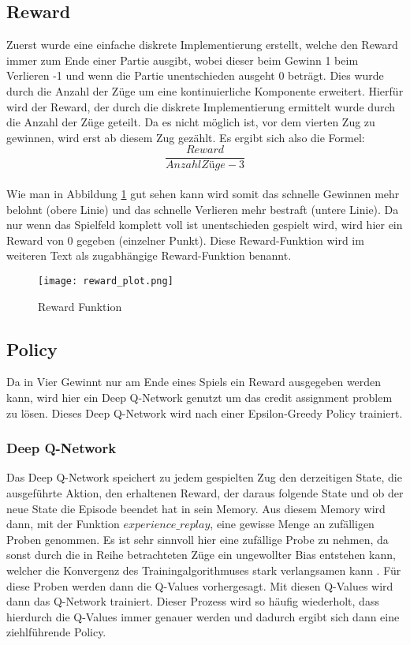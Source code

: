 \subsection{Reward}
 Zuerst wurde eine einfache diskrete Implementierung erstellt, welche den Reward immer zum Ende einer Partie ausgibt, wobei dieser beim Gewinn 1 beim Verlieren -1 und wenn die Partie unentschieden ausgeht 0 beträgt.
Dies wurde durch die Anzahl der Züge um eine kontinuierliche Komponente erweitert. Hierfür wird der Reward, der durch die diskrete Implementierung ermittelt wurde durch die Anzahl der Züge geteilt. Da es nicht möglich ist, vor dem vierten Zug zu gewinnen, wird erst ab diesem Zug gezählt. Es ergibt sich also die Formel: \\$$\frac{Reward}{Anzahl Züge-3}$$\\
Wie man in Abbildung \ref{fig:reward_function} gut sehen kann wird somit das schnelle Gewinnen mehr belohnt (obere Linie) und das schnelle Verlieren mehr bestraft (untere Linie). Da nur wenn das Spielfeld komplett voll ist unentschieden gespielt wird, wird hier ein Reward von 0 gegeben (einzelner Punkt). Diese Reward-Funktion wird im weiteren Text als zugabhängige Reward-Funktion benannt. \\

\begin{figure}[h!]
  \texttt{[image: reward\_plot.png]}
  \centering
  \caption{Reward Funktion}
  \label{fig:reward_function}
\end{figure}

\subsection{Policy}
Da in Vier Gewinnt nur am Ende eines Spiels ein Reward ausgegeben werden kann, wird hier ein Deep Q-Network genutzt um das credit assignment problem zu lösen. 
Dieses Deep Q-Network wird nach einer Epsilon-Greedy Policy trainiert.

\subsubsection{Deep Q-Network}
Das Deep Q-Network speichert zu jedem gespielten Zug den derzeitigen State, die ausgeführte Aktion, den erhaltenen Reward, der daraus folgende State und ob der neue State die Episode beendet hat in sein Memory. Aus diesem Memory wird dann, mit der Funktion $experience\_replay$, eine gewisse Menge an zufälligen Proben genommen. Es ist sehr sinnvoll hier eine zufällige Probe zu nehmen, da sonst durch die in Reihe betrachteten Züge ein ungewollter Bias entstehen kann, welcher die Konvergenz des Trainingalgorithmuses stark verlangsamen kann
\cite[Seite 469]{HandsOn2017}.
Für diese Proben werden dann die Q-Values vorhergesagt. Mit diesen Q-Values wird dann das Q-Network trainiert. 
Dieser Prozess wird so häufig wiederholt, dass hierdurch die Q-Values immer genauer  werden und dadurch ergibt sich dann eine ziehlführende Policy.


